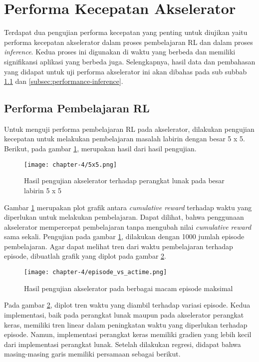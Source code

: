 \section{Performa Kecepatan Akselerator}

Terdapat dua pengujian performa kecepatan yang penting untuk diujikan yaitu performa kecepatan akselerator dalam proses pembelajaran \ac{RL} dan dalam proses \textit{inference}. Kedua proses ini digunakan di waktu yang berbeda dan memiliki signifikansi aplikasi yang berbeda juga. Selengkapnya, hasil data dan pembahasan yang didapat untuk uji performa akselerator ini akan dibahas pada sub subbab \ref{subsec:performance-learning} dan \ref{subsec:performance-inference}.

\subsection{Performa Pembelajaran \acl{RL}}
\label{subsec:performance-learning}

Untuk menguji performa pembelajaran \ac{RL} pada akselerator, dilakukan pengujian kecepatan untuk melakukan pembelajaran masalah labirin dengan besar 5 x 5. Berikut, pada gambar \ref{fig:5x5}, merupakan hasil dari hasil pengujian.

\begin{figure}[h]
	\centering
	\texttt{[image: chapter-4/5x5.png]}
	\caption{Hasil pengujian akselerator terhadap perangkat lunak pada besar labirin 5 x 5}
	\label{fig:5x5}
\end{figure}

Gambar \ref{fig:5x5} merupakan plot grafik antara \textit{cumulative reward} terhadap waktu yang diperlukan untuk melakukan pembelajaran. Dapat dilihat, bahwa penggunaan akselerator mempercepat pembelajaran tanpa mengubah nilai \textit{cumulative reward} sama sekali. Pengujian pada gambar \ref{fig:5x5}, dilakukan dengan 1000 jumlah episode pembelajaran. Agar dapat melihat tren dari waktu pembelajaran terhadap episode, dibuatlah grafik yang diplot pada gambar \ref{fig:episode_vs_actime}.

\begin{figure}[htbp]
	\centering
	\texttt{[image: chapter-4/episode\_vs\_actime.png]}
	\caption{Hasil pengujian akselerator pada berbagai macam episode maksimal}
	\label{fig:episode_vs_actime}
\end{figure}

Pada gambar \ref{fig:episode_vs_actime}, diplot tren waktu yang diambil terhadap variasi episode. Kedua implementasi, baik pada perangkat lunak maupun pada akselerator perangkat keras, memiliki tren linear dalam peningkatan waktu yang diperlukan terhadap episode. Namun, implementasi perangkat keras memiliki gradien yang lebih kecil dari implementasi perangkat lunak. Setelah dilakukan regresi, didapat bahwa masing-masing garis memiliki persamaan sebagai berikut.

